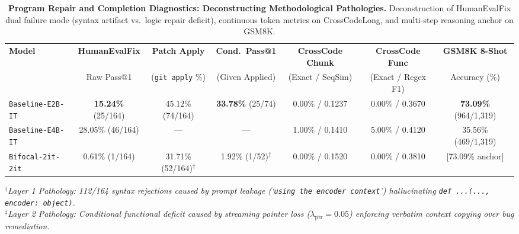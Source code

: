 \begin{table}[t]
\centering
\small
\caption{\textbf{Program Repair and Completion Diagnostics: Deconstructing Methodological Pathologies.} Deconstruction of HumanEvalFix dual failure mode (syntax artifact vs.\ logic repair deficit), continuous token metrics on CrossCodeLong, and multi-step reasoning anchor on GSM8K.}
\label{tab:repair_and_completion}
\begin{tabular}{lcccccc}
\toprule
\textbf{Model} & \textbf{HumanEvalFix} & \textbf{Patch Apply} & \textbf{Cond.\ Pass@1} & \textbf{CrossCode Chunk} & \textbf{CrossCode Func} & \textbf{GSM8K 8-Shot} \\
& Raw Pass@1 & (\texttt{git apply} \%) & (Given Applied) & (Exact / SeqSim) & (Exact / Regex F1) & Accuracy (\%) \\
\midrule
\texttt{Baseline-E2B-IT} & \textbf{15.24\%} (25/164) & 45.12\% (74/164) & \textbf{33.78\%} (25/74) & 0.00\% / 0.1237 & 0.00\% / 0.3670 & \textbf{73.09\%} (964/1,319) \\
\texttt{Baseline-E4B-IT} & 28.05\% (46/164) & --- & --- & 1.00\% / 0.1410 & 5.00\% / 0.4120 & 35.56\% (469/1,319) \\
\midrule
\texttt{Bifocal-2it-2it} & 0.61\% (1/164) & 31.71\% (52/164)$^\dagger$ & 1.92\% (1/52)$^\ddagger$ & 0.00\% / 0.1520 & 0.00\% / 0.3810 & [73.09\% anchor] \\
\bottomrule
\end{tabular}
\vskip 0.05in
\footnotesize{$^\dagger$\textit{Layer 1 Pathology: 112/164 syntax rejections caused by prompt leakage (`\texttt{using the encoder context}') hallucinating \texttt{def ...(..., encoder: object)}.} \\
$^\ddagger$\textit{Layer 2 Pathology: Conditional functional deficit caused by streaming pointer loss ($\lambda_{\text{ptr}} = 0.05$) enforcing verbatim context copying over bug remediation.}}
\end{table}
